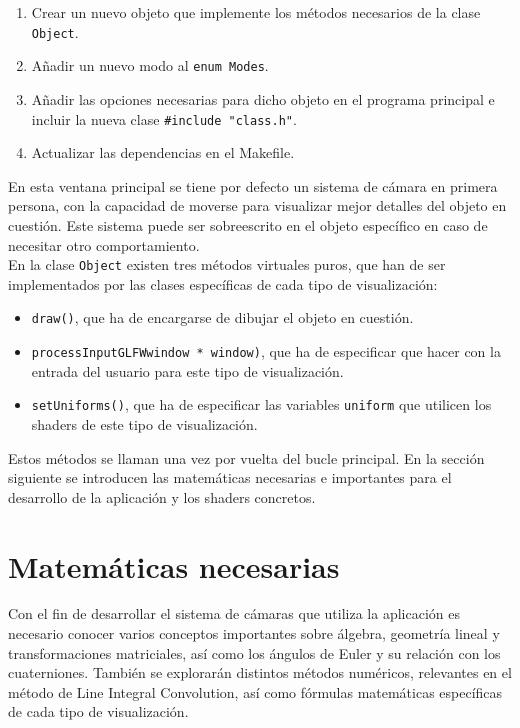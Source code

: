 \begin{enumerate}
		\item Crear un nuevo objeto que implemente los métodos necesarios
				de la clase \verb|Object|.
		\item Añadir un nuevo modo al \verb|enum Modes|.
		\item Añadir las opciones necesarias para dicho objeto en el programa
				principal e incluir la nueva clase \verb|#include "class.h"|.
		\item Actualizar las dependencias en el Makefile.
\end{enumerate}

En esta ventana principal se tiene por defecto un sistema de cámara en primera
persona, con la capacidad de moverse para visualizar mejor detalles del objeto
en cuestión. Este sistema puede ser sobreescrito en el objeto específico en
caso de necesitar otro comportamiento. \\

En la clase \verb|Object| existen tres métodos virtuales puros, que han de ser
implementados por las clases específicas de cada tipo de visualización:


\begin{itemize}
		\item \verb|draw()|, que ha de encargarse de dibujar el objeto en
				cuestión.
		\item \verb|processInputGLFWwindow * window)|, que ha de especificar que
				hacer con la entrada del usuario para este tipo de
				visualización.
		\item \verb|setUniforms()|, que ha de especificar las variables
				\verb|uniform| que utilicen los shaders de este tipo de
				visualización.
\end{itemize}

Estos métodos se llaman una vez por vuelta del bucle principal. En la sección
siguiente se introducen las matemáticas necesarias e importantes para el
desarrollo de la aplicación y los shaders concretos.

\section{Matemáticas necesarias}
\label{makereference5.4}

Con el fin de desarrollar el sistema de cámaras que utiliza la aplicación es
necesario conocer varios conceptos importantes sobre álgebra, geometría lineal y
transformaciones matriciales, así como los ángulos de Euler y su relación con
los cuaterniones. También se explorarán distintos métodos numéricos, relevantes
en el método de Line Integral Convolution, así como fórmulas matemáticas
específicas de cada tipo de visualización.

